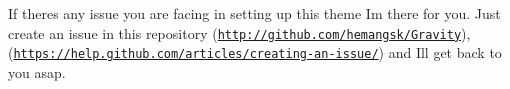 If there\textquotesingle{}s any issue you are facing in setting up this theme I\textquotesingle{}m there for you. Just create an issue in this repository (\href{http://github.com/hemangsk/Gravity}{\tt http\+://github.\+com/hemangsk/\+Gravity}), (\href{https://help.github.com/articles/creating-an-issue/}{\tt https\+://help.\+github.\+com/articles/creating-\/an-\/issue/}) and I\textquotesingle{}ll get back to you asap.



  





 